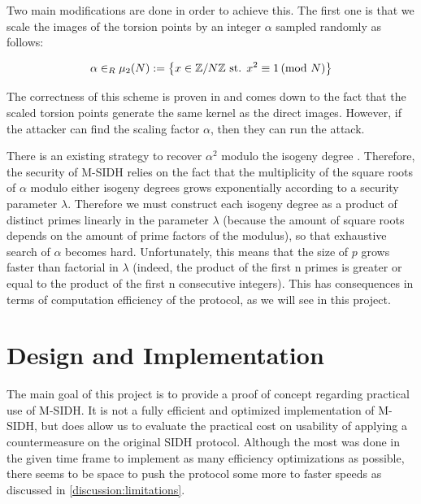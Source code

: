 \documentclass[a4paper,11pt,oneside]{report}
\begin{document}
    Two main modifications are done in order to achieve this. The first one is that we scale the images of the torsion points by an integer $\alpha$ sampled randomly as follows:

    \begin{equation}
        \alpha \in_{R} \mu _ 2 (N):= \left \{  x \in \mathbb{Z}/N\mathbb{Z} \textup{ st. } x^2 \equiv 1 \left ( \textrm{mod } N\right )   \right \}
    \end{equation}

    The correctness of this scheme is proven in \cite{msidh-original} and comes down to the fact that the scaled torsion points generate the same kernel as the direct images. However, if the attacker can find the scaling factor $\alpha$, then they can run the attack. 

    There is an existing strategy to recover $\alpha ^2$ modulo the isogeny degree \cite{msidh-original}. Therefore, the security of M-SIDH relies on the fact that the multiplicity of the square roots of $\alpha$ modulo either isogeny degrees grows exponentially according to a security parameter $\lambda$. Therefore we must construct each isogeny degree as a product of distinct primes linearly in the parameter $\lambda$ (because the amount of square roots depends on the amount of prime factors of the modulus), so that exhaustive search of $\alpha$ becomes hard. Unfortunately, this means that the size of $p$ grows faster than factorial in $\lambda$ (indeed, the product of the first n primes is greater or equal to the product of the first n consecutive integers). This has consequences in terms of computation efficiency of the protocol, as we will see in this project.



\chapter{Design and Implementation}

The main goal of this project is to provide a proof of concept regarding practical use of M-SIDH. It is not a fully efficient and optimized implementation of M-SIDH, but does allow us to evaluate the practical cost on usability of applying a countermeasure on the original SIDH protocol. Although the most was done in the given time frame to implement as many efficiency optimizations as possible, there seems to be space to push the protocol some more to faster speeds as discussed in \autoref{discussion:limitations}.
\end{document}
